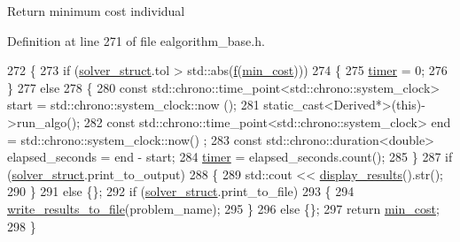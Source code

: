 Return minimum cost individual 

Definition at line 271 of file ealgorithm\+\_\+base.\+h.


\begin{DoxyCode}
272     \{
273         \textcolor{keywordflow}{if} (\hyperlink{classea_1_1_solver__base_a5e1d821809f2d26c6f882942ad728127}{solver\_struct}.tol > std::abs(\hyperlink{classea_1_1_solver__base_ae0a893780c93dfe17c1d17301de6494f}{f}(\hyperlink{classea_1_1_solver__base_af745cded954be26280d842c1e7c7f989}{min\_cost})))
274         \{
275             \hyperlink{classea_1_1_solver__base_ab0f0690de4b612c20b40f1b69a0e2743}{timer} = 0;
276         \}
277         \textcolor{keywordflow}{else}
278         \{
280             \textcolor{keyword}{const} std::chrono::time\_point<std::chrono::system\_clock> start = std::chrono::system\_clock::now
      ();
281             \textcolor{keyword}{static\_cast<}Derived*\textcolor{keyword}{>}(\textcolor{keyword}{this})->run\_algo();
282             \textcolor{keyword}{const} std::chrono::time\_point<std::chrono::system\_clock> end = std::chrono::system\_clock::now()
      ;
283             \textcolor{keyword}{const} std::chrono::duration<double> elapsed\_seconds = end - start;
284             \hyperlink{classea_1_1_solver__base_ab0f0690de4b612c20b40f1b69a0e2743}{timer} = elapsed\_seconds.count();
285         \}
287         \textcolor{keywordflow}{if} (\hyperlink{classea_1_1_solver__base_a5e1d821809f2d26c6f882942ad728127}{solver\_struct}.print\_to\_output)
288         \{
289             std::cout << \hyperlink{classea_1_1_solver__base_ae16049f3e8586c144165fa2916ccdbce}{display\_results}().str();
290         \}
291         \textcolor{keywordflow}{else} \{\};
292         \textcolor{keywordflow}{if} (\hyperlink{classea_1_1_solver__base_a5e1d821809f2d26c6f882942ad728127}{solver\_struct}.print\_to\_file)
293         \{
294             \hyperlink{classea_1_1_solver__base_a20dd7b75350cd42e13ecdc6c5714010a}{write\_results\_to\_file}(problem\_name);
295         \}
296         \textcolor{keywordflow}{else} \{\};
297         \textcolor{keywordflow}{return} \hyperlink{classea_1_1_solver__base_af745cded954be26280d842c1e7c7f989}{min\_cost};
298     \}
\end{DoxyCode}
\mbox{\label{classea_1_1_solver__base_a20dd7b75350cd42e13ecdc6c5714010a}} 

